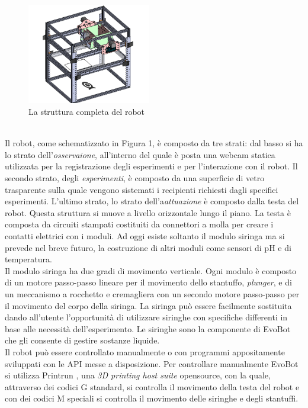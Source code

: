 \begin{figure}
\begin{center}
	  \includegraphics[width=0.48\textwidth]{immagini/observational-layer.png}
\end{center}
	 \caption{La struttura completa del robot}
	\end{figure} 
\\Il robot, come schematizzato in Figura 1, è composto da tre strati: dal basso si ha lo strato dell'\emph{osservaione}, all'interno del quale è posta una webcam statica utilizzata per la registrazione degli esperimenti e per l'interazione con il robot. Il secondo strato, degli \emph{esperimenti}, è composto da una superficie di vetro trasparente sulla quale vengono sistemati i recipienti richiesti dagli specifici esperimenti. L'ultimo strato, lo strato dell'a\emph{attuazione} è composto dalla testa del robot. Questa struttura si muove a livello orizzontale lungo il piano. La testa è composta da circuiti stampati costituiti da connettori a molla per creare i contatti elettrici con i moduli. Ad oggi esiste soltanto il modulo siringa ma si prevede nel breve futuro, la costruzione di altri moduli come sensori di pH e di temperatura. 
\\Il modulo siringa ha due gradi di movimento verticale. Ogni modulo è composto di un motore passo-passo lineare per il movimento dello stantuffo, \emph{plunger}, e di un meccanismo a rocchetto e cremagliera con un secondo motore passo-passo per il movimento del corpo della siringa. La siringa può essere facilmente sostituita dando all'utente l'opportunità di utilizzare siringhe con specifiche differenti in base alle necessità dell'esperimento. Le siringhe sono la componente di EvoBot che gli consente di gestire sostanze liquide. 
\\Il robot può essere controllato manualmente o con programmi appositamente sviluppati con le API messe a disposizione. Per controllare manualmente EvoBot si utilizza Printrun \cite{printrun}, una \emph{3D printing host suite}  opensource, con la quale, attraverso dei codici G standard, si controlla il movimento della testa del robot e con dei codici M speciali si controlla il movimento delle siringhe e degli stantuffi.

